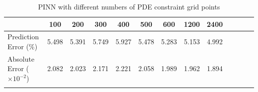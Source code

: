

\begin{table}[t]
\small
\centering
\begin{tabular}{ccccccccccccc}
\Xhline{3\arrayrulewidth}
\multicolumn{1}{l|}{\# Domain}           & 100                          & 200                          & 300                         & 400                & 500                            & 600     &1200       &2400                               \\ \hline
\multicolumn{1}{l|}{Prediction Error ($\%$)} & 5.498 & 5.391 & 5.749  & 5.927 & 5.478 & 5.283 & 5.153 & 4.992\\ \hline   
\multicolumn{1}{l|}{Absolute Error ($\times 10^{-2}$)} & 2.082 & 2.023 & 2.171 & 2.221 &2.058 &1.989 &1.962 &1.894 \\ \Xhline{3\arrayrulewidth}
\end{tabular}
\caption{PINN with different numbers of PDE constraint grid points}
\label{tab:pinn_pde}
\end{table}


